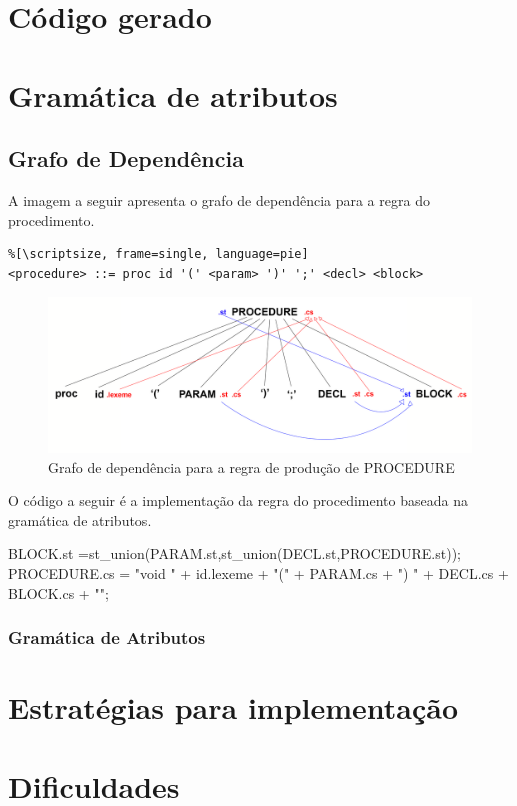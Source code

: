 \section{Código gerado}


\section{Gramática de atributos}


\newpage
\subsection{Grafo de Dependência}

A imagem a seguir apresenta o grafo de dependência para a regra do procedimento.

\begin{lstlisting}%[\scriptsize, frame=single, language=pie]
<procedure> ::= proc id '(' <param> ')' ';' <decl> <block>
\end{lstlisting}

\begin{figure}[H]
  \includegraphics[width=\textwidth]{img/dependency_graph.png}
  \caption{Grafo de dependência para a regra de produção de PROCEDURE}
  \label{fig:dependencegraph}
\end{figure}

O código a seguir é a implementação da regra do procedimento baseada na gramática de atributos.

\begin{verbbox}[\scriptsize]
    {BLOCK.st =st_union(PARAM.st,st_union(DECL.st,PROCEDURE.st));
    PROCEDURE.cs = "void " + id.lexeme + "(" + PARAM.cs + ") {\n" + DECL.cs + BLOCK.cs + "\n}\n"; }
\end{verbbox}
\theverbbox


\subsubsection{Gramática de Atributos}


\newpage
\section{Estratégias para implementação}


\newpage
\section{Dificuldades}
